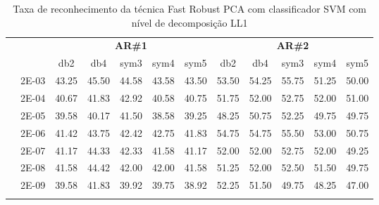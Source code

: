 \begin{table}[H]
\begin{tabular}{|c|c|c c c c c|c c c c c|}
	
\\\midrule
\end{tabular}

\end{table}



\begin{table}[H]
	\centering
    \normalsize
	\caption{Taxa de reconhecimento da técnica Fast Robust PCA com classificador SVM com nível de decomposição LL1}
	\begin{tabular}{|c|c|c c c c c|c c c c c|}
\cline{3-12}
\multicolumn{2}{c|}{\multirow{2}{*}{}} & \multicolumn{5}{c|}{\textbf{AR\#1}}  & \multicolumn{5}{c|}{\textbf{AR\#2}} \\\cline{3-12}

\multicolumn{2}{c|}{}  & db2 & db4 & sym3 & sym4 & sym5 & db2 & db4& sym3 & sym4 & sym5 \\\hline
\multicolumn{1}{|c|}{ \multirow{6}{*}{\rotatebox[origin=c]{90}{\textbf{Gamma}}} }
&2E-03&	43.25&	45.50&	44.58&	43.58&	43.50&	53.50&	54.25&	55.75&	51.25&	50.00	\\\cline{2-12}
&2E-04&	40.67&	41.83&	42.92&	40.58&	40.75&	51.75&	52.00&	52.75&	52.00&	51.00	\\\cline{2-12}
&2E-05&	39.58&	40.17&	41.50&	38.58&	39.25&	48.25&	50.75&	52.25&	49.75&	49.75	\\\cline{2-12}
&2E-06&	41.42&	43.75&	42.42&	42.75&	41.83&	54.75&	54.75&	55.50&	53.00&	50.75	\\\cline{2-12}
&2E-07&	41.17&	44.33&	42.33&	41.58&	41.17&	52.00&	52.00&	52.75&	52.00&	49.25	\\\cline{2-12}
&2E-08&	41.58&	44.42&	42.00&	42.00&	41.58&	51.25&	52.00&	52.50&	51.50&	49.75	\\\cline{2-12}
&2E-09&	39.58&	41.83&	39.92&	39.75&	38.92&	52.25&	51.50&	49.75&	48.25&	47.00	
	



\\ \midrule
\multicolumn{12}{c}{}\\ 


\end{tabular}
\end{table}
